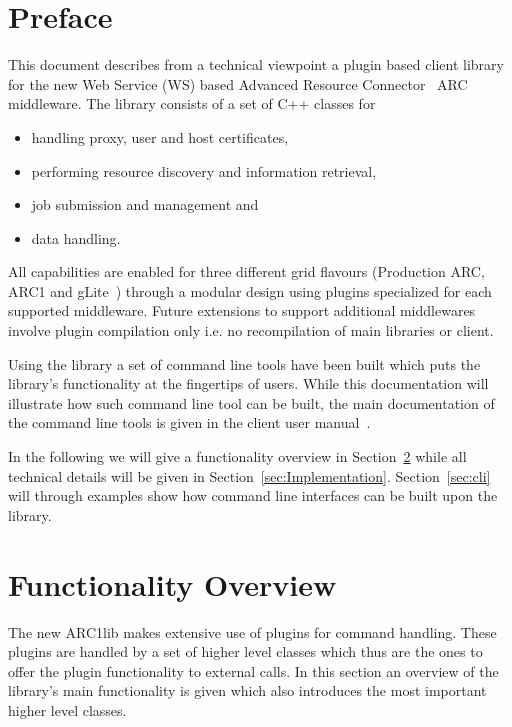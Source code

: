 \documentclass{book}
\begin{document}
\tableofcontents                          %
\newpage
\chapter{Preface}
\label{sec:intro}

This document describes from a technical viewpoint a plugin based client library for the new 
Web Service (WS) based Advanced Resource Connector~\cite{arc} ARC middleware. The library consists of 
a set of C++ classes for 

\begin{itemize}
\item{handling proxy, user and host certificates,}
\item{performing resource discovery and information retrieval,}
\item{job submission and management and}
\item{data handling.}
\end{itemize}

All capabilities are enabled for three different grid flavours (Production ARC, ARC1 and gLite~\cite{glite}) 
through a modular design using plugins specialized for each supported middleware. Future 
extensions to support additional middlewares involve plugin compilation only i.e. no recompilation 
of main libraries or client.

Using the library a set of command line tools have been built which puts the library's functionality 
at the fingertips of users. While this documentation will illustrate how such command line tool can be 
built, the main documentation of the command line tools is given in the client user manual~\cite{ui}.

In the following we will give a functionality overview in Section~\ref{sec:FuncOver} while all technical 
details will be given in Section~\ref{sec:Implementation}. Section~\ref{sec:cli} will through examples 
show how command line interfaces can be built upon the library.

\chapter{Functionality Overview}
\label{sec:FuncOver}
The new ARC1lib makes extensive use of plugins for command handling. These plugins are handled by a set 
of higher level classes which thus are the ones to offer the plugin functionality to external calls. In 
this section an overview of the library's main functionality is given which also introduces the most 
important higher level classes.
\end{document}
